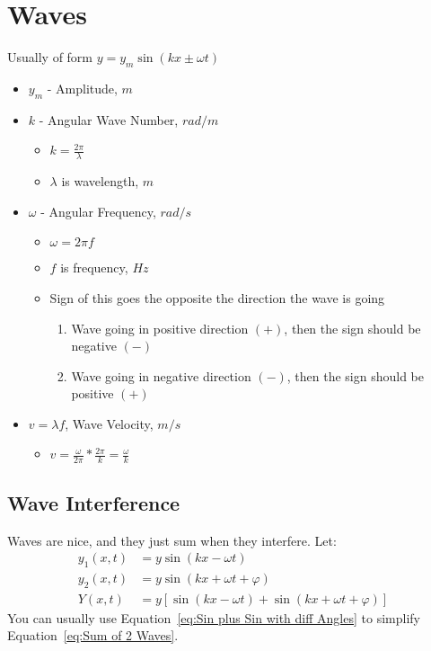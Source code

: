 \documentclass[10pt,letterpaper,final,twoside,notitlepage]{article}
\numberwithin{equation}{section} %
\begin{document}
\section{Waves} \label{sec:Waves}
{\Large Usually of form $y = y_{m} \sin \left( kx \pm \omega t \right)$}
	\begin{itemize}[noitemsep]
		\item $y_{m}$ - Amplitude, $m$
		\item $k$ - Angular Wave Number, $rad/m$
			\begin{itemize}[noitemsep, nolistsep]
				\item $k = \frac{2 \pi}{\lambda}$
				\item $\lambda$ is wavelength, $m$
			\end{itemize}
		\item $\omega$ - Angular Frequency, $rad/s$
			\begin{itemize}[noitemsep, nolistsep]
				\item $\omega = 2 \pi f$
				\item $f$ is frequency, $Hz$
				\item Sign of this goes the opposite the direction the wave is going
					\begin{enumerate}[noitemsep]
						\item Wave going in positive direction $\left( + \right)$, then the sign should be negative $\left( - \right)$
						\item Wave going in negative direction $\left( - \right)$, then the sign should be positive $\left( + \right)$
					\end{enumerate}
			\end{itemize}
		\item $v = \lambda f$, Wave Velocity, $m/s$
			\begin{itemize}[noitemsep]
				\item $v = \frac{\omega}{2 \pi} * \frac{2 \pi}{k} = \frac{\omega}{k}$
			\end{itemize}
	\end{itemize}

	\subsection*{Wave Interference} \label{subsec:Wave Interference}
	Waves are nice, and they just sum when they interfere. Let: 
	\begin{align}
		y_{1} \left( x, t \right) &= y \sin \left( kx - \omega t \right) \\
		y_{2} \left( x, t \right) &= y \sin \left( kx + \omega t + \varphi \right) \\
		Y \left( x, t \right) &= y\left[ \sin \left( kx - \omega t \right) + \sin \left( kx + \omega t + \varphi \right) \right] \label{eq:Sum of 2 Waves}
	\end{align}
	You can usually use Equation~\ref{eq:Sin plus Sin with diff Angles} to simplify Equation~\ref{eq:Sum of 2 Waves}.
\end{document}
